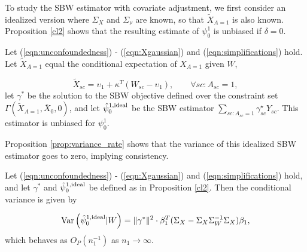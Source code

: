 To study the SBW estimator with covariate adjustment, we first consider an idealized version where $\Sigma_X$ and $\Sigma_\nu$ are known, so that $\tilde{X}_{A=1}$ is also known. Proposition \ref{cl2} shows that the resulting estimate of $\psi_0^1$ is unbiased if $\delta = 0$.

\begin{proposition}\label{cl2}
Let (\ref{eqn:unconfoundedness}) - (\ref{eqn:Xgaussian}) and (\ref{eqn:simplifications}) hold. Let $\tilde{X}_{A=1}$ equal the conditional expectation of $X_{A=1}$ given $W$,

\[ \tilde{X}_{sc} = \upsilon_1 + \kappa^T (W_{sc} - \upsilon_1), \qquad \forall sc: A_{sc} = 1,\] let $\gamma^*$ be the solution to the SBW objective defined over the constraint set $\Gamma(\tilde{X}_{A=1}, \bar{X}_0, 0)$, and let $\hat{\psi}^{1, \textup{ideal}}_0$ be the SBW estimator $\sum_{sc: A_{sc} = 1}\gamma^\star_{sc}Y_{sc}$. This estimator is unbiased for $\psi_0^1$.
\end{proposition}



Proposition \ref{prop:variance_rate} shows that the variance of this idealized SBW estimator goes to zero, implying consistency. 
\begin{proposition}\label{prop:variance_rate}
Let (\ref{eqn:unconfoundedness}) - (\ref{eqn:Xgaussian}) and (\ref{eqn:simplifications}) hold, and let $\gamma^*$ and $\hat{\psi}_0^{1, \textup{ideal}}$ be defined as in Proposition \ref{cl2}. Then the conditional variance is given by

\begin{align*}
\operatorname{Var}\left( \hat{\psi}_0^{1, \textup{ideal}} | W\right)  = \|\gamma^*\|^2 \cdot \beta_1^T(\Sigma_{X} - \Sigma_{X}\Sigma_{W}^{-1}\Sigma_{X})\beta_1, 
\end{align*}
which behaves as $O_P(n_1^{-1})$ as $n_1 \rightarrow \infty$.
\end{proposition}





